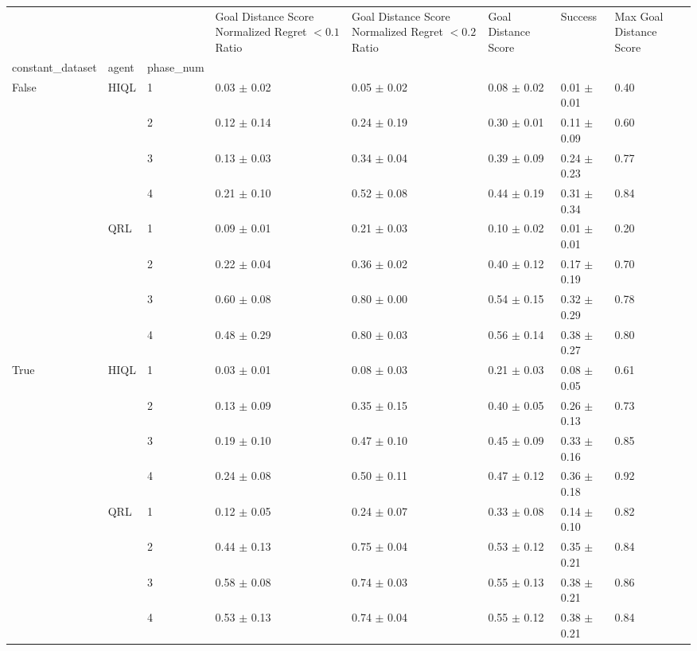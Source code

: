 \begin{tabular}{llllllll}
\toprule
 &  &  & Goal Distance Score Normalized Regret $< 0.1$ Ratio & Goal Distance Score Normalized Regret $< 0.2$ Ratio & Goal Distance Score & Success & Max Goal Distance Score \\
constant_dataset & agent & phase_num &  &  &  &  &  \\
\midrule
\multirow[t]{8}{*}{False} & \multirow[t]{4}{*}{HIQL} & 1 & 0.03 $\pm$ 0.02 & 0.05 $\pm$ 0.02 & 0.08 $\pm$ 0.02 & 0.01 $\pm$ 0.01 & 0.40 \\
 &  & 2 & 0.12 $\pm$ 0.14 & 0.24 $\pm$ 0.19 & 0.30 $\pm$ 0.01 & 0.11 $\pm$ 0.09 & 0.60 \\
 &  & 3 & 0.13 $\pm$ 0.03 & 0.34 $\pm$ 0.04 & 0.39 $\pm$ 0.09 & 0.24 $\pm$ 0.23 & 0.77 \\
 &  & 4 & 0.21 $\pm$ 0.10 & 0.52 $\pm$ 0.08 & 0.44 $\pm$ 0.19 & 0.31 $\pm$ 0.34 & 0.84 \\
\cline{2-8}
 & \multirow[t]{4}{*}{QRL} & 1 & 0.09 $\pm$ 0.01 & 0.21 $\pm$ 0.03 & 0.10 $\pm$ 0.02 & 0.01 $\pm$ 0.01 & 0.20 \\
 &  & 2 & 0.22 $\pm$ 0.04 & 0.36 $\pm$ 0.02 & 0.40 $\pm$ 0.12 & 0.17 $\pm$ 0.19 & 0.70 \\
 &  & 3 & 0.60 $\pm$ 0.08 & 0.80 $\pm$ 0.00 & 0.54 $\pm$ 0.15 & 0.32 $\pm$ 0.29 & 0.78 \\
 &  & 4 & 0.48 $\pm$ 0.29 & 0.80 $\pm$ 0.03 & 0.56 $\pm$ 0.14 & 0.38 $\pm$ 0.27 & 0.80 \\
\cline{1-8} \cline{2-8}
\multirow[t]{8}{*}{True} & \multirow[t]{4}{*}{HIQL} & 1 & 0.03 $\pm$ 0.01 & 0.08 $\pm$ 0.03 & 0.21 $\pm$ 0.03 & 0.08 $\pm$ 0.05 & 0.61 \\
 &  & 2 & 0.13 $\pm$ 0.09 & 0.35 $\pm$ 0.15 & 0.40 $\pm$ 0.05 & 0.26 $\pm$ 0.13 & 0.73 \\
 &  & 3 & 0.19 $\pm$ 0.10 & 0.47 $\pm$ 0.10 & 0.45 $\pm$ 0.09 & 0.33 $\pm$ 0.16 & 0.85 \\
 &  & 4 & 0.24 $\pm$ 0.08 & 0.50 $\pm$ 0.11 & 0.47 $\pm$ 0.12 & 0.36 $\pm$ 0.18 & 0.92 \\
\cline{2-8}
 & \multirow[t]{4}{*}{QRL} & 1 & 0.12 $\pm$ 0.05 & 0.24 $\pm$ 0.07 & 0.33 $\pm$ 0.08 & 0.14 $\pm$ 0.10 & 0.82 \\
 &  & 2 & 0.44 $\pm$ 0.13 & 0.75 $\pm$ 0.04 & 0.53 $\pm$ 0.12 & 0.35 $\pm$ 0.21 & 0.84 \\
 &  & 3 & 0.58 $\pm$ 0.08 & 0.74 $\pm$ 0.03 & 0.55 $\pm$ 0.13 & 0.38 $\pm$ 0.21 & 0.86 \\
 &  & 4 & 0.53 $\pm$ 0.13 & 0.74 $\pm$ 0.04 & 0.55 $\pm$ 0.12 & 0.38 $\pm$ 0.21 & 0.84 \\
\cline{1-8} \cline{2-8}
\bottomrule
\end{tabular}

